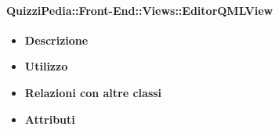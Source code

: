 \paragraph{QuizziPedia::Front-End::Views::EditorQMLView}
\begin{itemize}
	\item \textbf{Descrizione}
	\item \textbf{Utilizzo}
	\item \textbf{Relazioni con altre classi}
	\item \textbf{Attributi}
\end{itemize}